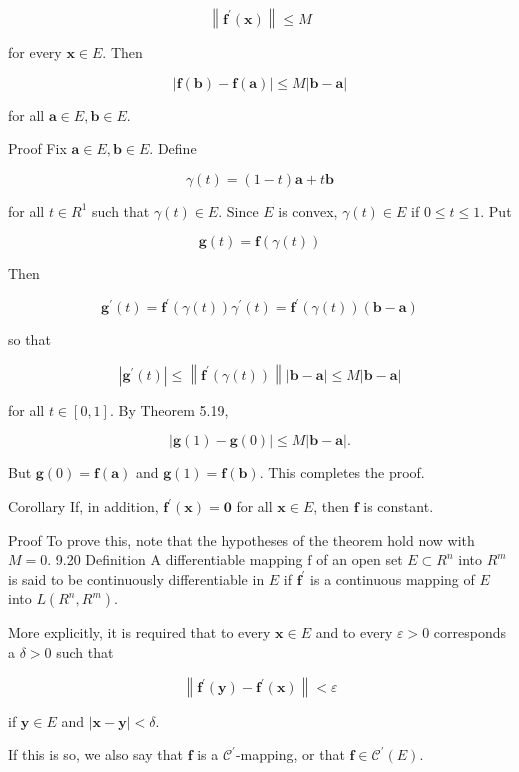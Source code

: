 \documentclass[10pt]{article}
\begin{document}
$$
\left\|\mathbf{f}^{\prime}(\mathbf{x})\right\| \leq M
$$

for every $\mathbf{x} \in E$. Then

$$
|\mathbf{f}(\mathbf{b})-\mathbf{f}(\mathbf{a})| \leq M|\mathbf{b}-\mathbf{a}|
$$

for all $\mathbf{a} \in E, \mathbf{b} \in E$.

Proof Fix $\mathbf{a} \in E, \mathbf{b} \in E$. Define

$$
\gamma(t)=(1-t) \mathbf{a}+t \mathbf{b}
$$

for all $t \in R^{1}$ such that $\gamma(t) \in E$. Since $E$ is convex, $\gamma(t) \in E$ if $0 \leq t \leq 1$. Put

$$
\mathbf{g}(t)=\mathbf{f}(\gamma(t))
$$

Then

$$
\mathbf{g}^{\prime}(t)=\mathbf{f}^{\prime}(\gamma(t)) \gamma^{\prime}(t)=\mathbf{f}^{\prime}(\gamma(t))(\mathbf{b}-\mathbf{a})
$$

so that

$$
\left|\mathbf{g}^{\prime}(t)\right| \leq\left\|\mathbf{f}^{\prime}(\gamma(t))\right\||\mathbf{b}-\mathbf{a}| \leq M|\mathbf{b}-\mathbf{a}|
$$

for all $t \in[0,1]$. By Theorem 5.19,

$$
|\mathbf{g}(1)-\mathbf{g}(0)| \leq M|\mathbf{b}-\mathbf{a}| .
$$

But $\mathbf{g}(0)=\mathbf{f}(\mathbf{a})$ and $\mathbf{g}(1)=\mathbf{f}(\mathbf{b})$. This completes the proof.

Corollary If, in addition, $\mathbf{f}^{\prime}(\mathbf{x})=\mathbf{0}$ for all $\mathbf{x} \in E$, then $\mathbf{f}$ is constant.

Proof To prove this, note that the hypotheses of the theorem hold now with $M=0$. 9.20 Definition A differentiable mapping $\mathrm{f}$ of an open set $E \subset R^{n}$ into $R^{m}$ is said to be continuously differentiable in $E$ if $\mathbf{f}^{\prime}$ is a continuous mapping of $E$ into $L\left(R^{n}, R^{m}\right)$.

More explicitly, it is required that to every $\mathbf{x} \in E$ and to every $\varepsilon>0$ corresponds a $\delta>0$ such that

$$
\left\|\mathbf{f}^{\prime}(\mathbf{y})-\mathbf{f}^{\prime}(\mathbf{x})\right\|<\varepsilon
$$

if $\mathbf{y} \in E$ and $|\mathbf{x}-\mathbf{y}|<\delta$.

If this is so, we also say that $\mathbf{f}$ is a $\mathscr{C}^{\prime}$-mapping, or that $\mathbf{f} \in \mathscr{C}^{\prime}(E)$.
\end{document}
